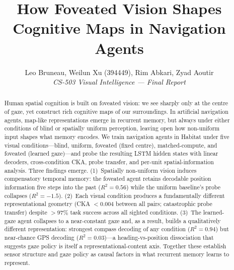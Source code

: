 \documentclass[10pt,conference,compsocconf]{IEEEtran}
\begin{document}
\title{\vspace{-8pt}How Foveated Vision Shapes Cognitive Maps in Navigation Agents\vspace{-12pt}}

\author{
  Leo Bruneau, Weilun Xu (394449), Rim Abkari, Zyad Aoutir\\
  \textit{CS-503 Visual Intelligence --- Final Report}
}

\maketitle

\begin{abstract}
Human spatial cognition is built on foveated vision: we see sharply only at the centre of gaze, yet construct rich cognitive maps of our surroundings. In artificial navigation agents, map-like representations emerge in recurrent memory, but always under either conditions of blind or spatially uniform perception, leaving open how non-uniform input shapes what memory encodes. We train navigation agents in Habitat under five visual conditions---blind, uniform, foveated (fixed centre), matched-compute, and foveated (learned gaze)---and probe the resulting LSTM hidden states with linear decoders, cross-condition CKA, probe transfer, and per-unit spatial-information analysis. Three findings emerge. (1)~Spatially non-uniform vision induces compensatory temporal memory: the foveated agent retains decodable position information five steps into the past ($R^2=0.56$) while the uniform baseline's probe collapses ($R^2=-1.5$). (2)~Each visual condition produces a fundamentally different representational geometry (CKA $<0.004$ between all pairs; catastrophic probe transfer) despite $>97\%$ task success across all sighted conditions. (3)~The learned-gaze agent collapses to a near-constant gaze and, as a result, builds a qualitatively different representation: strongest compass decoding of any condition ($R^2=0.94$) but near-chance GPS decoding ($R^2=0.03$)---a heading-vs-position dissociation that suggests gaze policy is itself a representational-content axis. Together these establish sensor structure and gaze policy as causal factors in what recurrent memory learns to represent.
\end{abstract}

\end{document}
